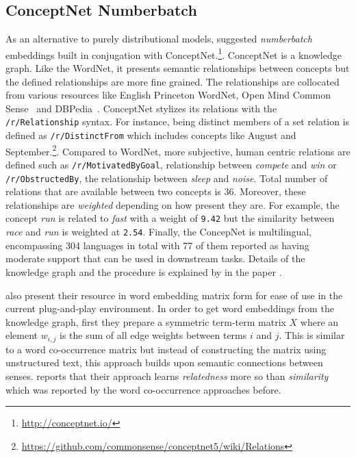 \subsection{ConceptNet Numberbatch}%
\label{sub:conceptnet_numberbatch}

As an alternative to purely distributional models, \textcite{speer_conceptnet_2017} suggested \emph{numberbatch} embeddings built in conjugation with ConceptNet.\footnote{\url{http://conceptnet.io/}}.
ConceptNet is a knowledge graph.
Like the WordNet, it presents semantic relationships between concepts but the defined relationships are more fine grained.
The relationships are collocated from various resources like English Princeton WordNet, Open Mind Common Sense~\cite{anacleto_can_2006} and DBPedia~\cite{auer_dbpedia_2007}.
ConceptNet stylizes its relations with the \texttt{/r/Relationship} syntax.
For instance, being distinct members of a set relation is defined as \texttt{/r/DistinctFrom} which includes concepts like August and September.\footnote{\url{https://github.com/commonsense/conceptnet5/wiki/Relations}}.
Compared to WordNet, more subjective, human centric relations are defined such as \texttt{/r/MotivatedByGoal}, relationship between \emph{compete} and \emph{win} or \texttt{/r/ObstructedBy}, the relationship between \emph{sleep} and \emph{noise}.
Total number of relations that are available between two concepts is 36.
Moreover, these relationships are \emph{weighted} depending on how present they are.
For example, the concept \emph{run} is related to \emph{fast} with a weight of \texttt{9.42} but the similarity between \emph{race} and \emph{run} is weighted at \texttt{2.54}.
Finally, the ConcepNet is multilingual, encompassing 304 languages in total with 77 of them reported as having moderate support that can be used in downstream tasks.
Details of the knowledge graph and the procedure is explained by \textcite{speer_conceptnet_2017} in the paper .

\citeauthor{speer_conceptnet_2017} also present their resource in word embedding matrix form for ease of use in the current plug-and-play environment.
In order to get word embeddings from the knowledge graph, first they prepare a symmetric term-term matrix $X$ where an element $w_{i,j}$ is the sum of all edge weights between terms $i$ and $j$.
This is similar to a word co-occurrence matrix but instead of constructing the matrix using unstructured text, this approach builds upon semantic connections between senses.
\citeauthor{speer_conceptnet_2017} reports that their approach learns \emph{relatedness} more so than \emph{similarity} which was reported by the word co-occurrence approaches before.

